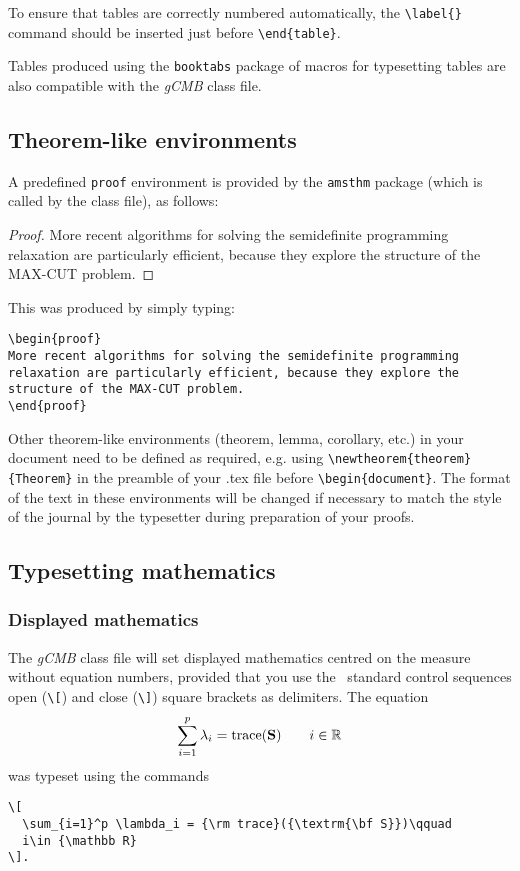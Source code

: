 \documentclass{gCMB2e}
\begin{document}
To ensure that tables are correctly numbered automatically, the
\verb"\label{}" command should be inserted just before
\verb"\end{table}".

Tables produced using the {\tt booktabs} package of macros for typesetting tables are also compatible with the {\it gCMB} class file.


\subsection{Theorem-like environments}

A predefined \verb"proof" environment is provided by the {\tt amsthm} package (which is called by the class file), as follows:

\begin{proof}
More recent algorithms for solving the semidefinite programming
relaxation are particularly efficient, because they explore the
structure of the MAX-CUT problem.
\end{proof}
\noindent This was produced by simply typing:

\begin{verbatim}
\begin{proof}
More recent algorithms for solving the semidefinite programming
relaxation are particularly efficient, because they explore the
structure of the MAX-CUT problem.
\end{proof}
\end{verbatim}
%
Other theorem-like environments (theorem, lemma, corollary, etc.) in your document need to be defined as required, e.g. using \verb"\newtheorem{theorem}{Theorem}" in the preamble of your .tex file before \verb"\begin{document}". The format of the text in these environments will be changed if necessary to match the style of the journal by the typesetter during preparation of your proofs.


\subsection{Typesetting mathematics}\label{TMth}

\subsubsection{Displayed mathematics}

The {\it gCMB} class file will set displayed mathematics centred on the measure without equation numbers, provided
that you use the \LaTeXe\ standard control sequences open (\verb"\[") and close (\verb"\]") square brackets as
delimiters. The equation
\[
  \sum_{i=1}^p \lambda_i = {\rm trace}({\textrm{\bf S}})\qquad
  i\in {\mathbb R}
\]
%
was typeset using the commands
%
\begin{verbatim}
\[
  \sum_{i=1}^p \lambda_i = {\rm trace}({\textrm{\bf S}})\qquad
  i\in {\mathbb R}
\].
\end{verbatim}
\end{document}
